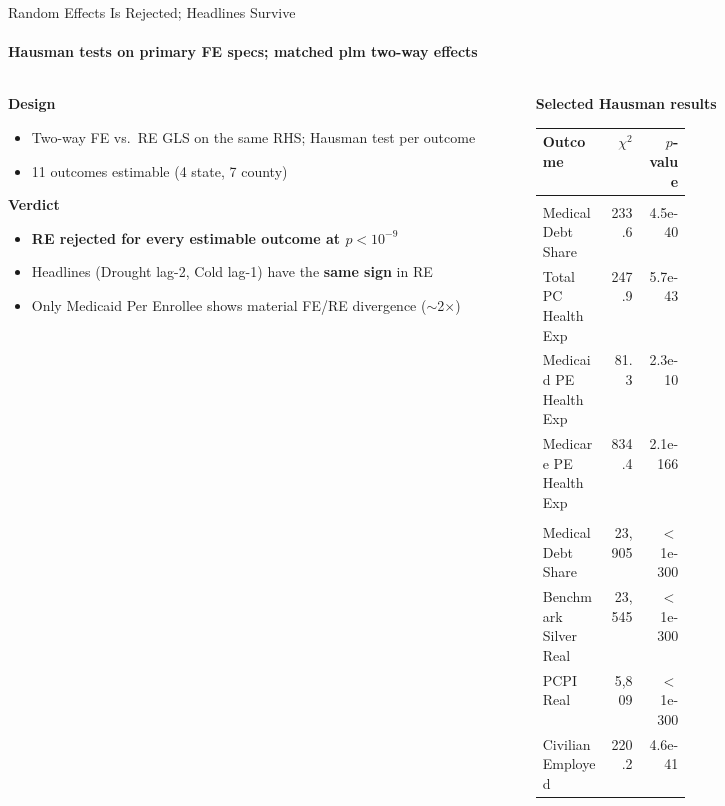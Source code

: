 \documentclass[aspectratio=169,11pt]{beamer}
\newcommand{\emphcolor}[1]{{\color{WarmOrange}\textbf{#1}}}
\newcommand{\tealtext}[1]{{\color{Teal}#1}}
\begin{document}
\begin{frame}{Random Effects Is Rejected; Headlines Survive}
  \framesubtitle{Hausman tests on primary FE specs; matched plm two-way effects}
  \begin{columns}[T]
    \begin{column}{0.50\textwidth}
      \textbf{\tealtext{Design}}
      \begin{itemize}\itemsep0.12em
        \item Two-way FE vs.\ RE GLS on the same RHS; Hausman test per outcome
        \item 11 outcomes estimable (4 state, 7 county)
      \end{itemize}
      \vspace{0.25em}
      \textbf{\tealtext{Verdict}}
      \begin{itemize}\itemsep0.12em
        \item \emphcolor{RE rejected for every estimable outcome at \(p<10^{-9}\)}
        \item Headlines (Drought lag-2, Cold lag-1) have the \emphcolor{same sign} in RE
        \item Only Medicaid Per Enrollee shows material FE/RE divergence (\(\sim\)2\(\times\))
      \end{itemize}
    \end{column}
    \begin{column}{0.46\textwidth}
      \textbf{\tealtext{Selected Hausman results}}\\[0.25em]
      \scriptsize
      \begin{tabular}{@{}>{\raggedright\arraybackslash}p{0.45\linewidth}rr@{}}
        \toprule
        Outcome & \(\chi^2\) & \(p\)-value \\
        \midrule
        \multicolumn{3}{l}{\textit{State}} \\
        Medical Debt Share          & 233.6 & 4.5e-40 \\
        Total PC Health Exp         & 247.9 & 5.7e-43 \\
        Medicaid PE Health Exp      & 81.3  & 2.3e-10 \\
        Medicare PE Health Exp      & 834.4 & 2.1e-166 \\
        \midrule
        \multicolumn{3}{l}{\textit{County}} \\
        Medical Debt Share          & 23{,}905 & $<$1e-300 \\
        Benchmark Silver Real       & 23{,}545 & $<$1e-300 \\
        PCPI Real                   & 5{,}809  & $<$1e-300 \\
        Civilian Employed           & 220.2 & 4.6e-41 \\
        \bottomrule
      \end{tabular}
    \end{column}
  \end{columns}
\end{frame}
\end{document}
